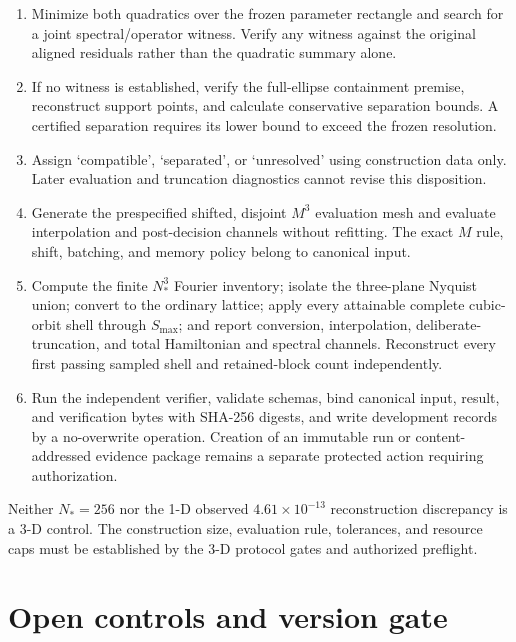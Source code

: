 \documentclass[11pt]{article}
\begin{document}
\begin{enumerate}[label=\arabic*.]
       record $N_*$ by the prespecified rule without changing thresholds, parameter
       bounds, amplitudes, parent scales, shell controls, or resource limits. Reaching a
       mesh, memory, runtime, or sample cap first gives `unresolved'.
 \item Minimize both quadratics over the frozen parameter rectangle and search for a
       joint spectral/operator witness. Verify any witness against the original aligned
       residuals rather than the quadratic summary alone.
 \item If no witness is established, verify the full-ellipse containment premise,
       reconstruct support points, and calculate conservative separation bounds. A
       certified separation requires its lower bound to exceed the frozen resolution.
 \item Assign `compatible', `separated', or `unresolved' using construction data only.
       Later evaluation and truncation diagnostics cannot revise this disposition.
 \item Generate the prespecified shifted, disjoint $M^3$ evaluation mesh and evaluate
       interpolation and post-decision channels without refitting. The exact $M$ rule,
       shift, batching, and memory policy belong to canonical input.
 \item Compute the finite $N_*^3$ Fourier inventory; isolate the three-plane Nyquist
       union; convert to the ordinary lattice; apply every attainable complete cubic-
       orbit shell through $S_{\max}$; and report conversion, interpolation, deliberate-
       truncation, and total Hamiltonian and spectral channels. Reconstruct every first
       passing sampled shell and retained-block count independently.
 \item Run the independent verifier, validate schemas, bind canonical input, result, and
       verification bytes with SHA-256 digests, and write development records by a
       no-overwrite operation. Creation of an immutable run or content-addressed
       evidence package remains a separate protected action requiring authorization.
\end{enumerate}

Neither $N_*=256$ nor the 1-D observed $4.61\times10^{-13}$ reconstruction discrepancy
is a 3-D control. The construction size, evaluation rule, tolerances, and resource caps
must be established by the 3-D protocol gates and authorized preflight.

\section{Open controls and version gate}
\end{document}
